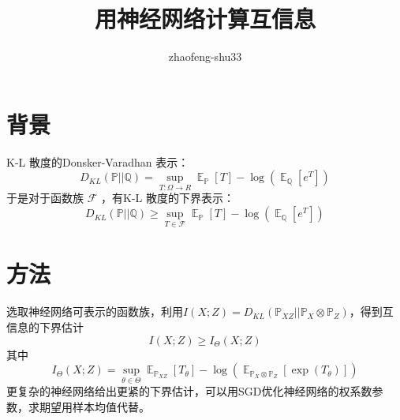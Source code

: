 \documentclass{article}
\DeclareMathOperator\E{\mathbb{E}}
\theoremstyle{definition}
\def\P{\mathbb{P}}
\def\Q{\mathbb{Q}}
\begin{document}
\title{用神经网络计算互信息}
\author{zhaofeng-shu33}
\maketitle
\section{背景}
K-L 散度的Donsker-Varadhan 表示：
\begin{equation}
D_{KL} (\P || \Q) = \sup_{T: \Omega \to R} \E_{\P}[T] - \log (\E_{\Q}[e^T])
\end{equation}
于是对于函数族 $ \mathcal{F}$ ，有K-L 散度的下界表示：
\begin{equation}
D_{KL} (\P || \Q) \geq \sup_{T \in \mathcal{F} } \E_{\P}[T] - \log (\E_{\Q}[e^T])
\end{equation}
\section{方法}
选取神经网络可表示的函数族，利用$ I(X; Z) = D_{KL}(\P_{XZ} || \P_X \otimes \P_Z) $，得到互信息的下界估计
\begin{equation}
I(X; Z) \geq I_{\Theta}(X; Z)
\end{equation}
其中
\begin{equation}
I_{\Theta}(X; Z) = \sup_{\theta \in \Theta} \E_{\P_{XZ}}[T_{\theta}] - \log ( \E_{\P_X \otimes \P_Z} [\exp(T_{\theta})])
\end{equation}
更复杂的神经网络给出更紧的下界估计，可以用SGD优化神经网络的权系数参数，求期望用样本均值代替。
\end{document}
